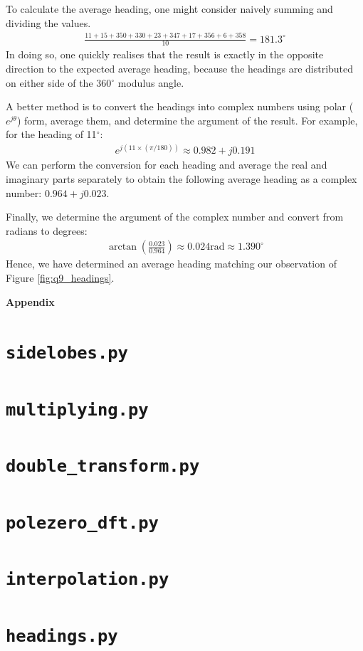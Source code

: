 \documentclass[a4paper, 11pt]{article}
\begin{document}
To calculate the average heading, one might consider naively summing and
dividing the values.
\begin{align*}
    \frac{11+15+350+330+23+347+17+356+6+358}{10} = 181.3^\circ
\end{align*}
In doing so, one quickly realises that the result is exactly in the opposite
direction to the expected average heading, because the headings are distributed
on either side of the 360$^\circ$ modulus angle.

A better method is to convert the headings into complex numbers using polar
($e^{j\theta}$) form, average them, and determine the argument of the result.
For example, for the heading of 11$^\circ$:
\begin{align*}
    e^{j(11\times(\pi/180))} \approx 0.982+j0.191
\end{align*}
We can perform the conversion for each heading and average the real and
imaginary parts separately to obtain the following average heading as a complex
number: $0.964+j0.023$.

Finally, we determine the argument of the complex number and convert from
radians to degrees:
\begin{align*}
    \arctan(\frac{0.023}{0.964}) \approx 0.024 \text{rad} \approx 1.390^\circ
\end{align*}
Hence, we have determined an average heading matching our observation of Figure
\ref{fig:q9_headings}.

\newpage
\appendix
\begin{center}
    \LARGE{\textbf{Appendix}}
\end{center}

\section{\texttt{sidelobes.py}}


\newpage
\section{\texttt{multiplying.py}}


\newpage
\section{\texttt{double\_transform.py}}


\newpage
\section{\texttt{polezero\_dft.py}}


\newpage
\section{\texttt{interpolation.py}}


\newpage
\section{\texttt{headings.py}}

\end{document}
